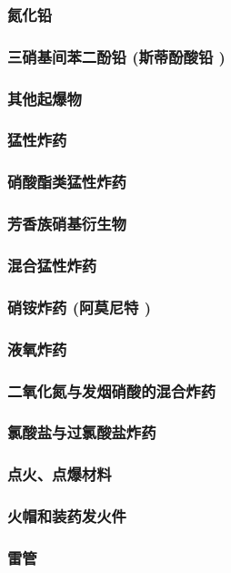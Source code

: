 \documentclass[UTF8]{../../ApplicationUniverse}
\begin{document}
    \subsubsection{氮化铅}
    \subsubsection{三硝基间苯二酚铅 (斯蒂酚酸铅 )}
    \subsubsection{其他起爆物}
\subsubsection{猛性炸药}
    \subsubsection{硝酸酯类猛性炸药}
    \subsubsection{芳香族硝基衍生物}
    \subsubsection{混合猛性炸药}
        \subsubsection{硝铵炸药 (阿莫尼特 )}
        \subsubsection{液氧炸药}
        \subsubsection{二氧化氮与发烟硝酸的混合炸药}
        \subsubsection{氯酸盐与过氯酸盐炸药}
\subsubsection{点火、点爆材料}
    \subsubsection{火帽和装药发火件}
    \subsubsection{雷管}
\end{document}
